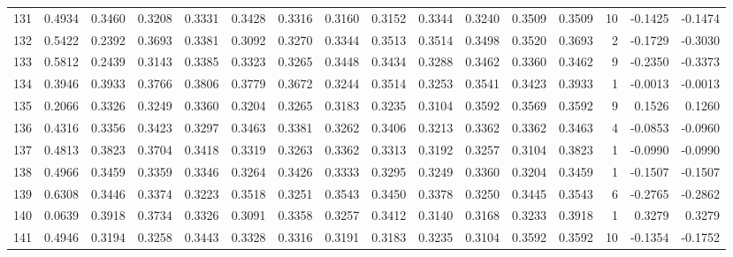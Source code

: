 \begin{tabular}{lrrrrrrrrrrrrrrr}
131 &      0.4934 &  0.3460 &  0.3208 &  0.3331 &  0.3428 &  0.3316 &  0.3160 &  0.3152 &  0.3344 &  0.3240 &   0.3509 &     0.3509 &     10 &                   -0.1425 &                    -0.1474 \\
132 &      0.5422 &  0.2392 &  0.3693 &  0.3381 &  0.3092 &  0.3270 &  0.3344 &  0.3513 &  0.3514 &  0.3498 &   0.3520 &     0.3693 &      2 &                   -0.1729 &                    -0.3030 \\
133 &      0.5812 &  0.2439 &  0.3143 &  0.3385 &  0.3323 &  0.3265 &  0.3448 &  0.3434 &  0.3288 &  0.3462 &   0.3360 &     0.3462 &      9 &                   -0.2350 &                    -0.3373 \\
134 &      0.3946 &  0.3933 &  0.3766 &  0.3806 &  0.3779 &  0.3672 &  0.3244 &  0.3514 &  0.3253 &  0.3541 &   0.3423 &     0.3933 &      1 &                   -0.0013 &                    -0.0013 \\
135 &      0.2066 &  0.3326 &  0.3249 &  0.3360 &  0.3204 &  0.3265 &  0.3183 &  0.3235 &  0.3104 &  0.3592 &   0.3569 &     0.3592 &      9 &                    0.1526 &                     0.1260 \\
136 &      0.4316 &  0.3356 &  0.3423 &  0.3297 &  0.3463 &  0.3381 &  0.3262 &  0.3406 &  0.3213 &  0.3362 &   0.3362 &     0.3463 &      4 &                   -0.0853 &                    -0.0960 \\
137 &      0.4813 &  0.3823 &  0.3704 &  0.3418 &  0.3319 &  0.3263 &  0.3362 &  0.3313 &  0.3192 &  0.3257 &   0.3104 &     0.3823 &      1 &                   -0.0990 &                    -0.0990 \\
138 &      0.4966 &  0.3459 &  0.3359 &  0.3346 &  0.3264 &  0.3426 &  0.3333 &  0.3295 &  0.3249 &  0.3360 &   0.3204 &     0.3459 &      1 &                   -0.1507 &                    -0.1507 \\
139 &      0.6308 &  0.3446 &  0.3374 &  0.3223 &  0.3518 &  0.3251 &  0.3543 &  0.3450 &  0.3378 &  0.3250 &   0.3445 &     0.3543 &      6 &                   -0.2765 &                    -0.2862 \\
140 &      0.0639 &  0.3918 &  0.3734 &  0.3326 &  0.3091 &  0.3358 &  0.3257 &  0.3412 &  0.3140 &  0.3168 &   0.3233 &     0.3918 &      1 &                    0.3279 &                     0.3279 \\
141 &      0.4946 &  0.3194 &  0.3258 &  0.3443 &  0.3328 &  0.3316 &  0.3191 &  0.3183 &  0.3235 &  0.3104 &   0.3592 &     0.3592 &     10 &                   -0.1354 &                    -0.1752 \\

\end{tabular}
